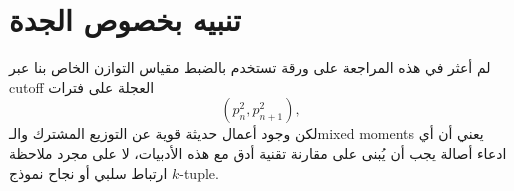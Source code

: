 \documentclass[12pt]{article}
\begin{document}
\section{تنبيه بخصوص الجدة}
لم أعثر في هذه المراجعة على ورقة تستخدم بالضبط مقياس التوازن الخاص بنا عبر cutoff العجلة على فترات
\[
(p_n^2,p_{n+1}^2),
\]
لكن وجود أعمال حديثة قوية عن التوزيع المشترك والـmixed moments يعني أن أي ادعاء أصالة يجب أن يُبنى على مقارنة تقنية أدق مع هذه الأدبيات، لا على مجرد ملاحظة ارتباط سلبي أو نجاح نموذج $k$-tuple.
\end{document}
